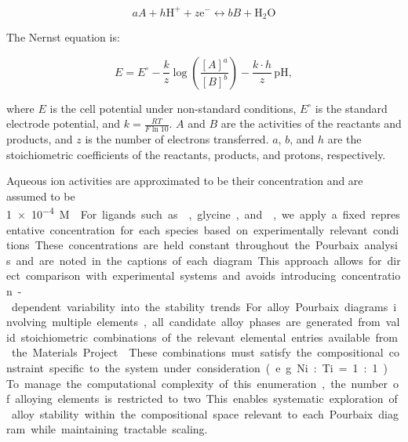 \documentclass[journal=jacsat,manuscript=article]{achemso}
\begin{document}
\begin{equation} \label{eq:reaction}
aA + h\text{H}^+ + z\text{e}^- \leftrightarrow bB + \text{H}_2\text{O}
\end{equation}

The Nernst equation is:

\begin{equation} \label{eq:nernst}
E = E^\circ - \frac{k}{z} \log \left(\frac{[A]^a}{[B]^b}\right) - \frac{k \cdot h}{z} \, \text{pH},
\end{equation}

where \( E \) is the cell potential under non-standard conditions, \( E^\circ \) is the standard electrode potential, and \( k = \frac{RT}{F \ln 10} \). \( A \) and \( B \) are the activities of the reactants and products, and \( z \) is the number of electrons transferred. \( a \), \( b \), and \( h \) are the stoichiometric coefficients of the reactants, products, and protons, respectively.

Aqueous ion activities are approximated to be their concentration and are assumed to be \SI{1e-4}M \cite{Huang2017ImprovedCompounds, Wang2020PredictingFunctional, Patel2019EfficientCompounds, Thompson2011PourbaixSystems}. For ligands such as , glycine, and , we apply a fixed representative concentration for each species based on experimentally relevant conditions. These concentrations are held constant throughout the Pourbaix analysis and are noted in the captions of each diagram. This approach allows for direct comparison with experimental systems and avoids introducing concentration-dependent variability into the stability trends.

For alloy Pourbaix diagrams involving multiple elements, all candidate alloy phases are generated from valid stoichiometric combinations of the relevant elemental entries available from the Materials Project \cite{Jain2013TheInnovation}. These combinations must satisfy the compositional constraint specific to the system under consideration (e.g. Ni:Ti = 1:1) \cite{Thompson2011PourbaixSystems}. To manage the computational complexity of this enumeration, the number of alloying elements is restricted to two. This enables systematic exploration of alloy stability within the compositional space relevant to each Pourbaix diagram while maintaining tractable scaling. 
\end{document}
